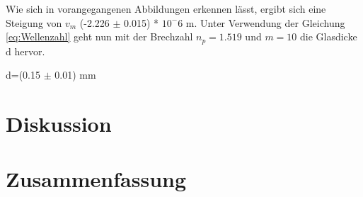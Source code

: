 \documentclass[12pt,a4paper,twoside]{article}
\begin{document}
\noindent
Wie sich in vorangegangenen Abbildungen erkennen lässt, ergibt sich eine Steigung von $v_{m}$ (-2.226 $\pm$ 0.015) * $10^-6$ m.
Unter Verwendung der Gleichung \ref{eq:Wellenzahl} geht nun mit der Brechzahl $n_{p}=1.519$ und $m=10$ die Glasdicke d hervor. \newline

\noindent
d=(0.15 $\pm$ 0.01) mm




\section{Diskussion} %


\section{Zusammenfassung} %


\printbibliography[heading=bibintoc]
\end{document}
